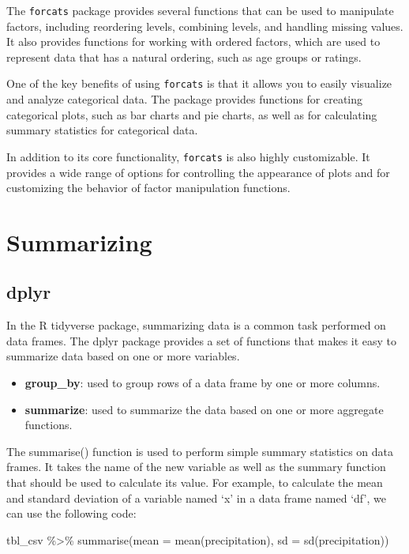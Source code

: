 \documentclass[
]{book}
\newenvironment{Shaded}{\begin{snugshade}}{\end{snugshade}}
\newcommand{\AttributeTok}[1]{\textcolor[rgb]{0.77,0.63,0.00}{#1}}
\newcommand{\FunctionTok}[1]{\textcolor[rgb]{0.00,0.00,0.00}{#1}}
\newcommand{\NormalTok}[1]{#1}
\newcommand{\SpecialCharTok}[1]{\textcolor[rgb]{0.00,0.00,0.00}{#1}}
\providecommand{\tightlist}{%
  \setlength{\itemsep}{0pt}\setlength{\parskip}{0pt}}
\begin{document}
The \texttt{forcats} package provides several functions that can be used to manipulate factors, including reordering levels, combining levels, and handling missing values. It also provides functions for working with ordered factors, which are used to represent data that has a natural ordering, such as age groups or ratings.

One of the key benefits of using \texttt{forcats} is that it allows you to easily visualize and analyze categorical data. The package provides functions for creating categorical plots, such as bar charts and pie charts, as well as for calculating summary statistics for categorical data.

In addition to its core functionality, \texttt{forcats} is also highly customizable. It provides a wide range of options for controlling the appearance of plots and for customizing the behavior of factor manipulation functions.

\hypertarget{summarizing}{%
\section{Summarizing}\label{summarizing}}

\hypertarget{dplyr-1}{%
\subsection*{dplyr}\label{dplyr-1}}

In the R tidyverse package, summarizing data is a common task performed on data frames. The dplyr package provides a set of functions that makes it easy to summarize data based on one or more variables.

\begin{itemize}
\tightlist
\item
  \textbf{group\_by}: used to group rows of a data frame by one or more columns.
\item
  \textbf{summarize}: used to summarize the data based on one or more aggregate functions.
\end{itemize}

The summarise() function is used to perform simple summary statistics on data frames. It takes the name of the new variable as well as the summary function that should be used to calculate its value. For example, to calculate the mean and standard deviation of a variable named `x' in a data frame named `df', we can use the following code:

\begin{Shaded}
\begin{Highlighting}[]
\NormalTok{tbl\_csv }\SpecialCharTok{\%\textgreater{}\%}
  \FunctionTok{summarise}\NormalTok{(}\AttributeTok{mean =} \FunctionTok{mean}\NormalTok{(precipitation), }
            \AttributeTok{sd =} \FunctionTok{sd}\NormalTok{(precipitation))}
\end{Highlighting}
\end{Shaded}
\end{document}

